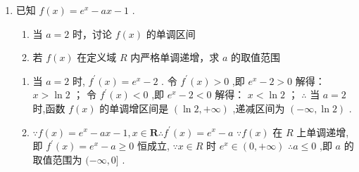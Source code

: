 \begin{enumerate}
    \item 已知 $f\left( x\right)  = {{e}}^{x} - {ax} - 1$ .
    \begin{enumerate}
        \item 当 $a = 2$ 时，讨论 $f\left( x\right)$ 的单调区间
        \item 若 $f\left( x\right)$ 在定义域 ${R}$ 内严格单调递增，求 $a$ 的取值范围
    \end{enumerate}
    \begin{jieda}
        \begin{enumerate}
            \item 当 $a = 2$ 时, ${f}^{\prime }\left( x\right)  = {e}^{x} - 2$ .
            令 ${f}^{\prime }\left( x\right)  > 0$ ,即 ${e}^{x} - 2 > 0$ 解得： $x > \ln 2$ ；
            令 ${f}^{\prime }\left( x\right)  < 0$ ,即 ${e}^{x} - 2 < 0$ 解得： $x < \ln 2$ ；
            $\therefore$ 当 $a = 2$ 时,函数 $f\left( x\right)$ 的单调增区间是 $\left( {\ln 2, + \infty }\right)$ ,递减区间为 $\left( {-\infty ,\ln 2}\right)$ .
            \item $\because f\left( x\right)  = {e}^{x} - {ax} - 1,x \in  \mathbf{R}\therefore {f}^{\prime }\left( x\right)  = {e}^{x} - a$
            $\because f\left( x\right)$ 在 ${R}$ 上单调递增,即 ${f}^{\prime }\left( x\right)  = {e}^{x} - a \geq  0$ 恒成立,
            $\because x \in  {R}$ 时 ${e}^{x} \in  \left( {0, + \infty }\right)$
            $\therefore a \leq  0$ ,即 $a$ 的取值范围为 $( - \infty ,0\rbrack$ .
        \end{enumerate}
    \end{jieda}
    

\end{enumerate}

